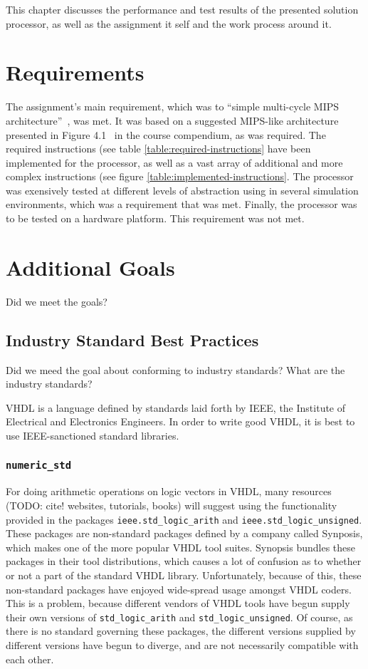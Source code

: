 This chapter discusses the performance and test results of the presented solution processor, as well as the assignment it self and the work process around it.

\section{Requirements}

The assignment's main requirement, which was to ``simple multi-cycle MIPS architecture''~\cite[p.114]{compendium}, was met.
It was based on a suggested MIPS-like architecture presented in Figure 4.1~\cite[p.115]{compendium} in the course compendium, as was required.
The required instructions (see table \ref{table:required-instructions} have been implemented for the processor, as well as a vast array of additional and more complex instructions (see figure \ref{table:implemented-instructions}.
The processor was exensively tested at different levels of abstraction using in several simulation environments, which was a requirement that was met.
Finally, the processor was to be tested on a hardware platform.
This requirement was not met.

\section{Additional Goals}

Did we meet the goals? 

\subsection{Industry Standard Best Practices}

Did we meed the goal about conforming to industry standards?
What are the industry standards?

VHDL is a language defined by standards laid forth by IEEE, the Institute of Electrical and Electronics Engineers.
In order to write good VHDL, it is best to use IEEE-sanctioned standard libraries.

\subsubsection{\texttt{numeric\_std}}


For doing arithmetic operations on logic vectors in VHDL, many resources (TODO: cite! websites, tutorials, books) will suggest using the functionality provided in the packages \texttt{ieee.std\_logic\_arith} and \texttt{ieee.std\_logic\_unsigned}.
These packages are non-standard packages defined by a company called Synposis, which makes one of the more popular VHDL tool suites.
Synopsis bundles these packages in their tool distributions, which causes a lot of confusion as to whether or not a part of the standard VHDL library.
Unfortunately, because of this, these non-standard packages have enjoyed wide-spread usage amongst VHDL coders.
This is a problem, because different vendors of VHDL tools have begun supply their own versions of \texttt{std\_logic\_arith} and \texttt{std\_logic\_unsigned}.
Of course, as there is no standard governing these packages, the different versions supplied by different versions have begun to diverge, and are not necessarily compatible with each other.

